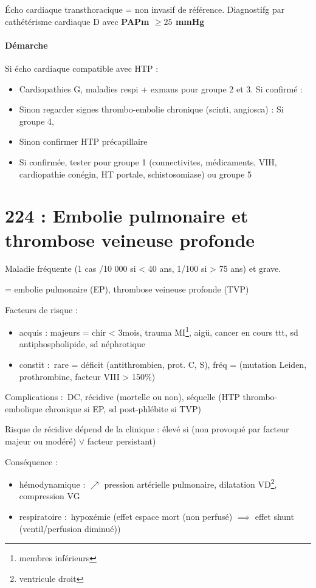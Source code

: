 \documentclass{article}
\begin{document}
Écho cardiaque transthoracique = non invasif de référence. Diagnostifg par
cathétérisme cardiaque D avec \textbf{PAPm $\ge 25$ mmHg}

\paragraph{Démarche}
Si écho cardiaque compatible avec HTP :
\begin{itemize}
  \item Cardiopathies G, maladies respi + exmans pour groupe 2 et 3. Si confirmé
    : \faHandStopO
  \item Sinon regarder signes thrombo-embolie chronique (scinti, angiosca) : Si
    groupe 4, \faHandStopO
  \item Sinon confirmer HTP précapillaire 
  \item Si confirmée, tester pour groupe 1 (connectivites, médicaments, VIH,
    cardiopathie conégin, HT portale, schistosomiase) ou groupe 5
\end{itemize}



\section{224 : Embolie pulmonaire et thrombose veineuse profonde}%
\label{sec:224_embolie_pulmonaire_et_thrombose_veineuse_profonde}

Maladie fréquente (1 cas /10 000 si < 40 ans, 1/100 si > 75 ans) et grave.

= {embolie pulmonaire (EP), thrombose veineuse profonde (TVP)}

Facteurs de risque :
\begin{itemize}
  \item acquis : majeurs = chir < 3mois, trauma MI\footnote{membres inférieurs},
    \faHospitalO{} aigü, cancer en cours  ttt, sd antiphospholipide, sd
    néphrotique
  \item constit : rare = déficit (antithrombien, prot. C, S), fréq = (mutation {Leiden,
    prothrombine}, facteur VIII > 150\%)
\end{itemize}
Complications : DC, récidive (mortelle ou non), séquelle (HTP thrombo-embolique
chronique si EP, sd post-phlébite si TVP)

Risque de récidive dépend de la clinique : élevé si (non provoqué par facteur
majeur ou modéré) $\vee$ facteur persistant)

Conséquence :
\begin{itemize}
  \item hémodynamique : $\nearrow$ pression artérielle pulmonaire, dilatation
    VD\footnote{ventricule droit}, compression VG
  \item respiratoire : hypoxémie (effet espace mort (non perfusé) $\implies$ effet shunt
    (ventil/perfusion diminué))
\end{itemize}
\end{document}
